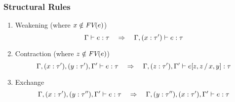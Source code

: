 \documentclass{article}
\begin{document}
\subsubsection{Structural Rules}

\begin{enumerate}
\item
  Weakening (where \(x\inn\FV(e)\)) \[
   \TTypes{\GG}{e}{\Gt}
     \quad\Rightarrow\quad
   \TTypes{\GG,(\TAnn{x}{\Gt'})}{e}{\Gt}
   \]
\item
  Contraction (where \(z\inn\FV(e)\)) \[
   \TTypes{\GG,(\TAnn{x}{\Gt'}),(\TAnn{y}{\Gt'}),\GG'}{e}{\Gt}
     \quad\Rightarrow\quad
   \TTypes{\GG,(\TAnn{z}{\Gt'}),\GG'}{\substt{e}{x}{z}{y}{z}}{\Gt}
   \]
\item
  Exchange \[
   \TTypes{\GG,(\TAnn{x}{\Gt'}),(\TAnn{y}{\Gt''}),\GG'}{e}{\Gt}
     \quad\Rightarrow\quad
   \TTypes{\GG,(\TAnn{y}{\Gt''}),(\TAnn{x}{\Gt'}),\GG'}{e}{\Gt}
   \]
\end{enumerate}
\end{document}

